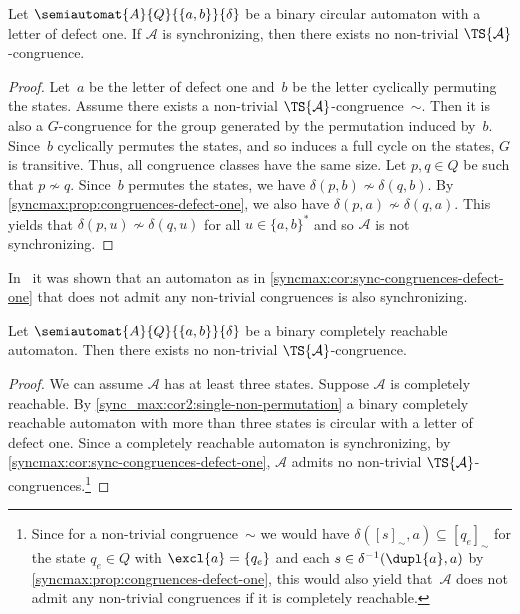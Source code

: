 \begin{corollary} \label{syncmax:cor:sync-congruences-defect-one}
	Let $\semiautomat{A}{Q}{\{a,b\}}{\delta}$
	be a binary circular automaton with a letter of defect one.
	If $\mathcal A$ is synchronizing,
	then there exists no non-trivial $\TS{\mathcal A}$-congruence.	
\end{corollary}
\begin{proof}
	Let~$a$ be the letter of defect one and~$b$ be the letter cyclically permuting the states.
	Assume there exists a non-trivial $\TS{\mathcal A}$-congruence~$\sim$.
	Then it is also a $G$-congruence for the group generated
	by the permutation induced by~$b$.
	Since~$b$ cyclically permutes the states, and so induces a full cycle on the states,
	$G$ is transitive.
	Thus, all congruence classes have the same size.
	Let $p, q \in Q$ be such that $p \not\sim q$.
	Since~$b$ permutes the states, we have $\delta(p, b) \not\sim \delta(q, b)$.
	By \cref{syncmax:prop:congruences-defect-one}, we also have $\delta(p, a) \not\sim \delta(q, a)$.
	This yields that $\delta(p, u) \not\sim \delta(q, u)$
	for all $u \in \{a,b\}^*$ and so $\mathcal A$ is not synchronizing.	
\end{proof}

In~\cite[Cor.~4]{Volkov24} it was shown that an automaton as in \cref{syncmax:cor:sync-congruences-defect-one}
that does not admit any non-trivial congruences is also synchronizing.

\begin{corollary}
	Let $\semiautomat{A}{Q}{\{a,b\}}{\delta}$
	be a binary completely reachable automaton.
	Then there exists no non-trivial $\TS{\mathcal A}$-congruence.	
\end{corollary}
\begin{proof}
	We can assume $\mathcal A$ has at least three states.
	Suppose $\mathcal A$ is completely reachable.
	By \cref{sync_max:cor2:single-non-permutation} a binary completely reachable automaton
	with more than three states is circular with a letter of defect one.
	Since a completely reachable automaton is synchronizing,
	by \cref{syncmax:cor:sync-congruences-defect-one},  
	$\mathcal A$ admits no non-trivial $\TS{\mathcal A}$-congruences.\footnote{Since
		for a non-trivial congruence~$\sim$
		we would have  $\delta([s]_{\sim}, a) \subseteq [q_e]_{\sim}$ for the 
		state $q_e \in Q$ with $\excl{a} = \{q_e\}$
		and each $s \in \delta^{-1}(\dupl{a}, a)$
		by \cref{syncmax:prop:congruences-defect-one},
		this would also yield that~$\mathcal A$
		does not admit any non-trivial congruences
		if it is completely reachable.}
\end{proof}

